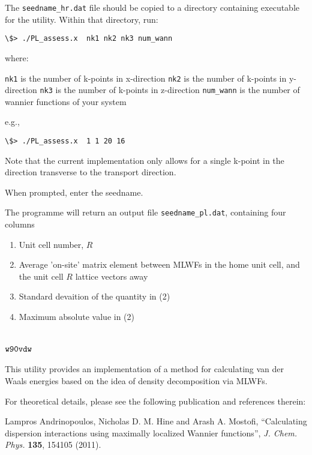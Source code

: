 The \verb|seedname_hr.dat| file should be copied to a directory containing
executable for the utility. Within that directory, run:

\begin{verbatim}
\$> ./PL_assess.x  nk1 nk2 nk3 num_wann
\end{verbatim}

where:

 \verb|nk1| is the number of k-points in x-direction
 \verb|nk2| is the number of k-points in y-direction
 \verb|nk3| is the number of k-points in z-direction
 \verb|num_wann| is the number of wannier functions of your system

e.g.,

\begin{verbatim}
\$> ./PL_assess.x  1 1 20 16
\end{verbatim}

Note that the current implementation only allows for a single k-point
in the direction transverse to the transport direction.

When prompted, enter the seedname.

The programme will return an output file \verb|seedname_pl.dat|, containing four columns
\begin{enumerate}
        \item Unit cell number, $R$
        \item Average 'on-site' matrix element between MLWFs in
             the home unit cell, and the unit cell $R$ lattice
             vectors away
        \item Standard devaition of the quantity in (2)
        \item Maximum absolute value in (2)
\end{enumerate}

\section{$\tt{w90vdw}$}
\label{sec:w90vdw}

This utility provides an implementation of a method for calculating
van der Waals energies based on the idea of density decomposition via
MLWFs.

For theoretical details, please see the following publication
and references therein:

Lampros Andrinopoulos, Nicholas D. M. Hine and Arash A. Mostofi,
``Calculating dispersion interactions using maximally localized
Wannier functions'', \emph{J. Chem. Phys.} \textbf{135}, 154105 (2011).

